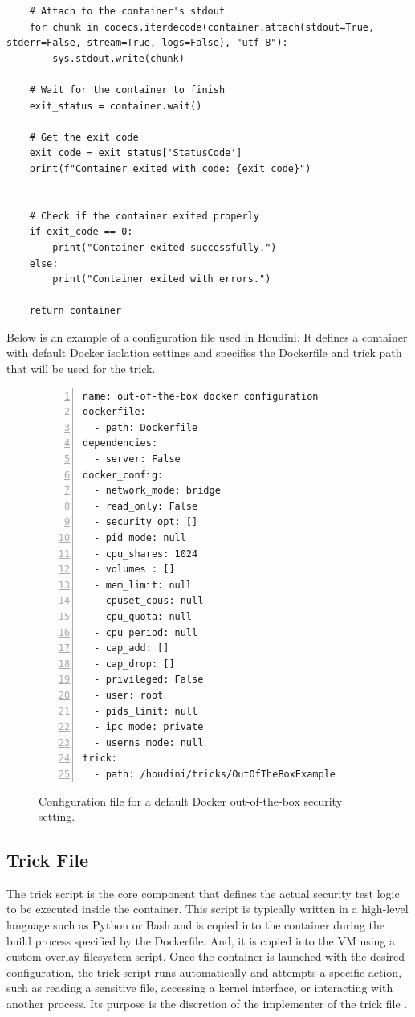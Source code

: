 \documentclass[12pt]{report}
\begin{document}
\begin{doublespace}
\begin{lstlisting}
    # Attach to the container's stdout
    for chunk in codecs.iterdecode(container.attach(stdout=True, stderr=False, stream=True, logs=False), "utf-8"):
        sys.stdout.write(chunk)

    # Wait for the container to finish
    exit_status = container.wait()
    
    # Get the exit code
    exit_code = exit_status['StatusCode']
    print(f"Container exited with code: {exit_code}")
    

    # Check if the container exited properly
    if exit_code == 0:
        print("Container exited successfully.")
    else:
        print("Container exited with errors.")

    return container
\end{lstlisting}


Below is an example of a configuration file used in Houdini. It defines a container with default Docker isolation settings and specifies the Dockerfile and trick path that will be used for the trick.

\begin{figure}[H]
\caption{Configuration file for a default Docker out-of-the-box security setting.}
\label{fig:configuration-file}
\begin{lstlisting}[caption={}, numbers=left, numberstyle=\tiny, stepnumber=1, breaklines=true, frame=single, backgroundcolor=\color{gray!10}, basicstyle=\ttfamily\scriptsize, showspaces=false, showstringspaces=false]
name: out-of-the-box docker configuration
dockerfile:
  - path: Dockerfile
dependencies:
  - server: False
docker_config: 
  - network_mode: bridge
  - read_only: False
  - security_opt: []
  - pid_mode: null
  - cpu_shares: 1024
  - volumes : []
  - mem_limit: null
  - cpuset_cpus: null
  - cpu_quota: null
  - cpu_period: null
  - cap_add: []
  - cap_drop: []
  - privileged: False
  - user: root
  - pids_limit: null
  - ipc_mode: private
  - userns_mode: null
trick:
  - path: /houdini/tricks/OutOfTheBoxExample
\end{lstlisting}
\end{figure}




\subsection{Trick File}
\label{sec:trick_file}

The trick script is the core component that defines the actual security test logic to be executed inside the container. This script is typically written in a high-level language such as Python or Bash and is copied into the container during the build process specified by the Dockerfile. And, it is copied into the VM using a custom overlay filesystem script. Once the container is launched with the desired configuration, the trick script runs automatically and attempts a specific action, such as reading a sensitive file, accessing a kernel interface, or interacting with another process. Its purpose is the discretion of the implementer of the trick file .


\end{doublespace}
\end{document}
